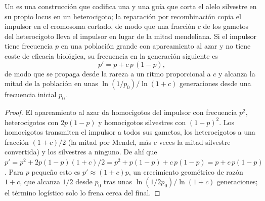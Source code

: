 \begin{theorem}\label{thm:b3:genetic-engineering:drive}
Un \emph{} es una construcción que codifica una  y una
guía que corta el alelo silvestre en su propio locus en un heterocigoto;
la reparación por recombinación copia el impulsor en el cromosoma
cortado, de modo que una fracción $c$ de los gametos del heterocigoto
lleva el impulsor en lugar de la mitad mendeliana. Si el impulsor tiene
frecuencia $p$ en una población grande con apareamiento al azar y no
tiene coste de eficacia biológica, su frecuencia en la generación
siguiente es
\[
p' = p + c\,p\,(1 - p),
\]
de modo que se propaga desde la rareza a un ritmo proporcional a $c$ y
alcanza la mitad de la población en unas $\ln(1/p_{0})/\ln(1 + c)$
generaciones desde una frecuencia inicial $p_{0}$.
\end{theorem}
\begin{proof}
El apareamiento al azar da homocigotos del impulsor con frecuencia
$p^{2}$, heterocigotos con $2p(1-p)$ y homocigotos silvestres con
$(1-p)^{2}$. Los homocigotos transmiten el impulsor a todos sus gametos,
los heterocigotos a una fracción $(1 + c)/2$ (la mitad por Mendel, más
$c$ veces la mitad silvestre convertida) y los silvestres a ninguno. De
ahí que $p' = p^{2} + 2p(1-p)(1+c)/2
= p^{2} + p(1-p) + c\,p(1-p) = p + c\,p(1-p)$. Para $p$ pequeño esto es
$p' \approx (1+c)p$, un crecimiento geométrico de razón $1 + c$, que
alcanza $1/2$ desde $p_{0}$ tras unas $\ln(1/2p_{0})/\ln(1+c)$
generaciones; el término logístico solo lo frena cerca del final.
\end{proof}

